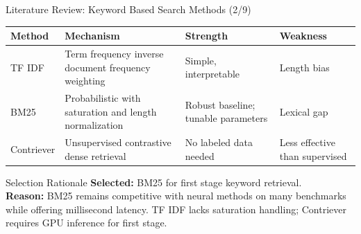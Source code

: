 \documentclass[aspectratio=169,xcolor=dvipsnames]{beamer}
\begin{document}
\begin{frame}{Literature Review: Keyword Based Search Methods (2/9)}
    \scriptsize
    \begin{table}
        \centering
        \renewcommand{\arraystretch}{1.1}
        \begin{tabular}{p{}|p{}|p{}|p{}}
        \toprule
        \textbf{Method} & \textbf{Mechanism} & \textbf{Strength} & \textbf{Weakness} \\
        \midrule
        TF IDF \cite{sparck1972statistical} & Term frequency inverse document frequency weighting & Simple, interpretable & Length bias \\
        \midrule
        BM25 \cite{robertson2009probabilistic} & Probabilistic with saturation and length normalization & Robust baseline; tunable parameters & Lexical gap \\
        \midrule
        Contriever \cite{izacard2022unsupervised} & Unsupervised contrastive dense retrieval & No labeled data needed & Less effective than supervised \\
        \bottomrule
        \end{tabular}
    \end{table}
    
    \vspace{0.3em}
    \begin{block}{Selection Rationale}
        \textbf{Selected:} BM25 for first stage keyword retrieval. \\
        \textbf{Reason:} BM25 remains competitive with neural methods on many benchmarks while offering millisecond latency. TF IDF lacks saturation handling; Contriever requires GPU inference for first stage.
    \end{block}
\end{frame}
\end{document}
